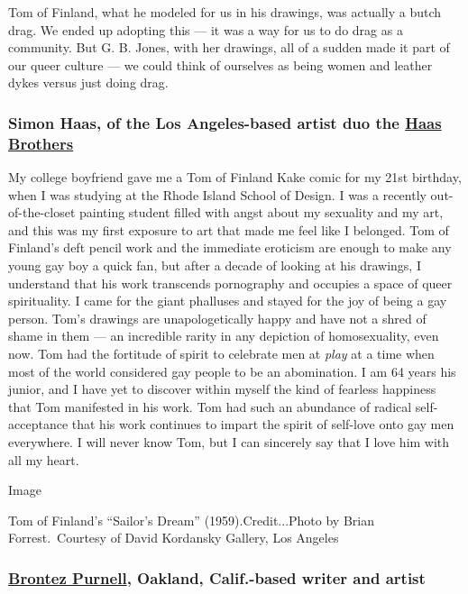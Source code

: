 Tom of Finland, what he modeled for us in his drawings, was actually a
butch drag. We ended up adopting this --- it was a way for us to do drag
as a community. But G. B. Jones, with her drawings, all of a sudden made
it part of our queer culture --- we could think of ourselves as being
women and leather dykes versus just doing drag.

\hypertarget{simon-haas-of-the-los-angeles-based-artist-duo-the-haas-brothers}{%
\subsubsection{\texorpdfstring{\textbf{Simon Haas, of the Los
Angeles-based artist duo the}
\textbf{\href{http://www.thehaasbrothers.com/}{Haas
Brothers}}}{Simon Haas, of the Los Angeles-based artist duo the Haas Brothers}}\label{simon-haas-of-the-los-angeles-based-artist-duo-the-haas-brothers}}

My college boyfriend gave me a Tom of Finland Kake comic for my 21st
birthday, when I was studying at the Rhode Island School of Design. I
was a recently out-of-the-closet painting student filled with angst
about my sexuality and my art, and this was my first exposure to art
that made me feel like I belonged. Tom of Finland's deft pencil work and
the immediate eroticism are enough to make any young gay boy a quick
fan, but after a decade of looking at his drawings, I understand that
his work transcends pornography and occupies a space of queer
spirituality. I came for the giant phalluses and stayed for the joy of
being a gay person. Tom's drawings are unapologetically happy and have
not a shred of shame in them --- an incredible rarity in any depiction
of homosexuality, even now. Tom had the fortitude of spirit to celebrate
men at \emph{play} at a time when most of the world considered gay
people to be an abomination. I am 64 years his junior, and I have yet to
discover within myself the kind of fearless happiness that Tom
manifested in his work. Tom had such an abundance of radical
self-acceptance that his work continues to impart the spirit of
self-love onto gay men everywhere. I will never know Tom, but I can
sincerely say that I love him with all my heart.

Image

Tom of Finland's ``Sailor's Dream'' (1959).Credit...Photo by Brian
Forrest.~Courtesy of David Kordansky Gallery, Los Angeles

\hypertarget{brontez-purnell-oakland-calif-based-writer-and-artist}{%
\subsubsection{\texorpdfstring{\textbf{\href{https://www.whiting.org/awards/winners/brontez-purnell}{Brontez
Purnell}, Oakland, Calif.-based writer and
artist}}{Brontez Purnell, Oakland, Calif.-based writer and artist}}\label{brontez-purnell-oakland-calif-based-writer-and-artist}}

